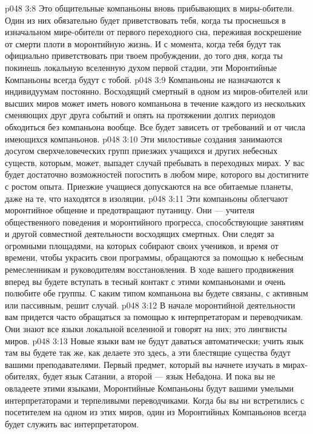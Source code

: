 \vs p048 3:8 \bibnobreakspace {} Это общительные компаньоны вновь прибывающих в миры\hyp{}обители. Один из них обязательно будет приветствовать тебя, когда ты проснешься в изначальном мире\hyp{}обители от первого переходного сна, переживая воскрешение от смерти плоти в моронтийную жизнь. И с момента, когда тебя будут так официально приветствовать при твоем пробуждении, до того дня, когда ты покинешь локальную вселенную духом первой стадии, эти Моронтийные Компаньоны всегда будут с тобой.
\vs p048 3:9 Компаньоны не назначаются к индивидуумам постоянно. Восходящий смертный в одном из миров\hyp{}обителей или высших миров может иметь нового компаньона в течение каждого из нескольких сменяющих друг друга событий и опять на протяжении долгих периодов обходиться без компаньона вообще. Все будет зависеть от требований и от числа имеющихся компаньонов.
\vs p048 3:10 \bibnobreakspace {} Эти милостивые создания занимаются досугом сверхчеловеческих групп приезжих учащихся и других небесных существ, которым, может, выпадет случай пребывать в переходных мирах. У вас будет достаточно возможностей погостить в любом мире, которого вы достигните с ростом опыта. Приезжие учащиеся допускаются на все обитаемые планеты, даже на те, что находятся в изоляции.
\vs p048 3:11 \bibnobreakspace {} Эти компаньоны облегчают моронтийное общение и предотвращают путаницу. Они --- учителя общественного поведения и моронтийного прогресса, способствующие занятиям и другой совместной деятельности восходящих смертных. Они следят за огромными площадями, на которых собирают своих учеников, и время от времени, чтобы украсить свои программы, обращаются за помощью к небесным ремесленникам и руководителям восстановления. В ходе вашего продвижения вперед вы будете вступать в тесный контакт с этими компаньонами и очень полюбите обе группы. С каким типом компаньона вы будете связаны, с активным или пассивным, решит случай.
\vs p048 3:12 \bibnobreakspace {} В начале моронтийной деятельности вам придется часто обращаться за помощью к интерпретаторам и переводчикам. Они знают все языки локальной вселенной и говорят на них; это лингвисты миров.
\vs p048 3:13 Новые языки вам не будут даваться автоматически; учить язык там вы будете так же, как делаете это здесь, а эти блестящие существа будут вашими преподавателями. Первый предмет, который вы начнете изучать в мирах\hyp{}обителях, будет язык Сатании, а второй --- язык Небадона. И пока вы не овладеете этими языками, Моронтийные Компаньоны будут вашими умелыми интерпретаторами и терпеливыми переводчиками. Когда бы вы ни встретились с посетителем на одном из этих миров, один из Моронтийных Компаньонов всегда будет служить вас интерпретатором.
